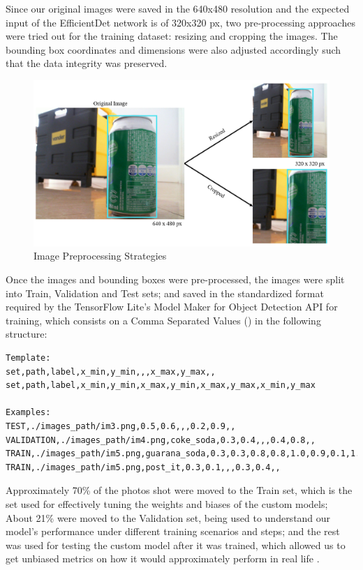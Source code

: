 \documentclass[openright]{normas-utf-tex} %
\begin{document}
Since our original images were saved in the 640x480 resolution and the expected
input of the EfficientDet network is of 320x320 px, two pre-processing
approaches were tried out for the training dataset: resizing and cropping the
images. The bounding box coordinates and dimensions were also adjusted
accordingly such that the data integrity was preserved. 

\begin{figure}[H]
	\centering
	\includegraphics[width=1\textwidth]{./images/image_preprocessing.png}
	\caption[Image Preprocessing Strategies]{Image Preprocessing Strategies}
\end{figure}

Once the images and bounding boxes were pre-processed, the images were split
into Train, Validation and Test sets; and saved in the standardized format
required by the TensorFlow Lite's Model Maker for Object Detection API for
training, which consists on a Comma Separated Values () in the following structure:

\begin{lstlisting}[caption={CSV format for specifying the Train, Test and Validation 
	image sets for training models using the TensorFlow's Model Maker API for Object 
	Detection},label={lst:csvFormatTrain}]
Template:
set,path,label,x_min,y_min,,,x_max,y_max,,
set,path,label,x_min,y_min,x_max,y_min,x_max,y_max,x_min,y_max

Examples:
TEST,./images_path/im3.png,0.5,0.6,,,0.2,0.9,,
VALIDATION,./images_path/im4.png,coke_soda,0.3,0.4,,,0.4,0.8,,
TRAIN,./images_path/im5.png,guarana_soda,0.3,0.3,0.8,0.8,1.0,0.9,0.1,1.0
TRAIN,./images_path/im5.png,post_it,0.3,0.1,,,0.3,0.4,,
\end{lstlisting}

Approximately 70\% of the photos shot were moved to the Train set, which is the set used for effectively 
tuning the weights and biases of the custom models; About 21\% were moved to the Validation set, 
being used to understand our model's performance under different training scenarios and steps; 
and the rest was used for testing the custom model after it was trained, which allowed us to 
get unbiased metrics on how it would approximately perform in real life \cite{MluExplain}.
\end{document}
